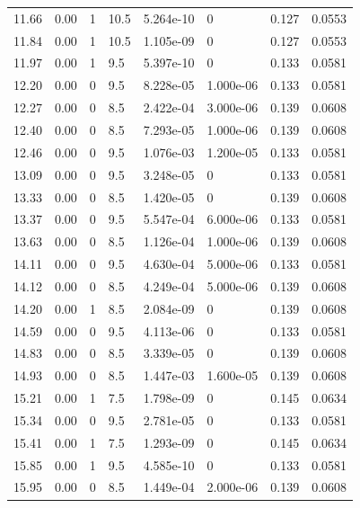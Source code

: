 \documentclass[preview]{standalone}
\begin{document}
{{{\begin{tabular}{L{1.2cm}C{1.2cm} C{0.3cm}C{0.5cm} C{1.4cm}C{1.4cm} C{1.4cm}C{1.4cm}}
  11.66  &  0.00  & 1     & 10.5 &  5.264e-10  & 0  & 0.127 &  0.0553   \\ 
  11.84  &  0.00  & 1     & 10.5 &  1.105e-09  & 0  & 0.127 &  0.0553   \\ 
  11.97  &  0.00  & 1     & 9.5 &  5.397e-10  & 0  & 0.133 &  0.0581   \\ 
  12.20  &  0.00  & 0     & 9.5 &  8.228e-05  & 1.000e-06  & 0.133 &  0.0581   \\ 
  12.27  &  0.00  & 0     & 8.5 &  2.422e-04  & 3.000e-06  & 0.139 &  0.0608   \\ 
  12.40  &  0.00  & 0     & 8.5 &  7.293e-05  & 1.000e-06  & 0.139 &  0.0608   \\ 
  12.46  &  0.00  & 0     & 9.5 &  1.076e-03  & 1.200e-05  & 0.133 &  0.0581   \\ 
  13.09  &  0.00  & 0     & 9.5 &  3.248e-05  & 0  & 0.133 &  0.0581   \\ 
  13.33  &  0.00  & 0     & 8.5 &  1.420e-05  & 0  & 0.139 &  0.0608   \\ 
  13.37  &  0.00  & 0     & 9.5 &  5.547e-04  & 6.000e-06  & 0.133 &  0.0581   \\ 
  13.63  &  0.00  & 0     & 8.5 &  1.126e-04  & 1.000e-06  & 0.139 &  0.0608   \\ 
  14.11  &  0.00  & 0     & 9.5 &  4.630e-04  & 5.000e-06  & 0.133 &  0.0581   \\ 
  14.12  &  0.00  & 0     & 8.5 &  4.249e-04  & 5.000e-06  & 0.139 &  0.0608   \\ 
  14.20  &  0.00  & 1     & 8.5 &  2.084e-09  & 0  & 0.139 &  0.0608   \\ 
  14.59  &  0.00  & 0     & 9.5 &  4.113e-06  & 0  & 0.133 &  0.0581   \\ 
  14.83  &  0.00  & 0     & 8.5 &  3.339e-05  & 0  & 0.139 &  0.0608   \\ 
  14.93  &  0.00  & 0     & 8.5 &  1.447e-03  & 1.600e-05  & 0.139 &  0.0608   \\ 
  15.21  &  0.00  & 1     & 7.5 &  1.798e-09  & 0  & 0.145 &  0.0634   \\ 
  15.34  &  0.00  & 0     & 9.5 &  2.781e-05  & 0  & 0.133 &  0.0581   \\ 
  15.41  &  0.00  & 1     & 7.5 &  1.293e-09  & 0  & 0.145 &  0.0634   \\ 
  15.85  &  0.00  & 1     & 9.5 &  4.585e-10  & 0  & 0.133 &  0.0581   \\ 
  15.95  &  0.00  & 0     & 8.5 &  1.449e-04  & 2.000e-06  & 0.139 &  0.0608   \\ 

\end{tabular}}}}
\end{document}
